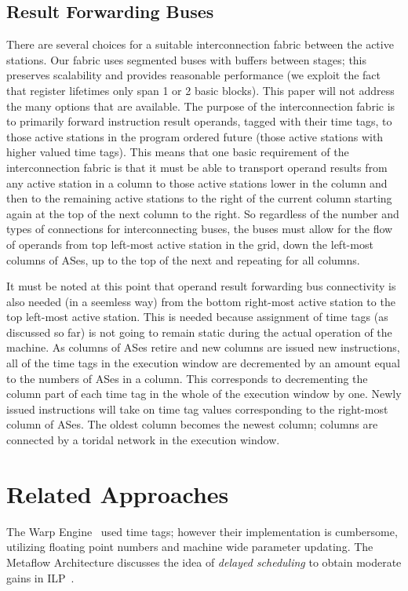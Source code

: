 \documentclass[10pt,twocolumn,dvips]{article}
\begin{document}
\subsection{Result Forwarding Buses}
\vspace{-0.1in}
There are several choices for a suitable interconnection fabric between
the active stations.  Our fabric uses segmented buses with buffers
between stages; this preserves
scalability and provides reasonable performance (we exploit the fact
that register lifetimes only span 1 or 2 basic blocks).
This paper will not address the
many options that are available.  The purpose of the
interconnection fabric is to primarily forward instruction result
operands, tagged with their time tags, 
to those active stations in the program ordered future (those
active stations with higher valued time tags).  This means that one
basic requirement of the interconnection fabric is that it must be able
to transport operand results from any active station in a column to
those active stations lower in the column and then to the remaining
active stations to the right of the current column starting again at
the top of the next column to the right.  So regardless of the number
and types of connections for interconnecting buses, the buses must
allow for the flow of operands from top left-most active station in the
grid, down the left-most columns of ASes, up to the top of the next and
repeating for all columns.

It must be noted at this point that operand result forwarding
bus connectivity is also needed (in a seemless way) from the bottom
right-most active station to the top left-most active station.
This is needed because assignment of time tags (as discussed so far)
is not going to remain static during the actual operation of the machine.
As columns of ASes retire and new columns are issued new instructions,
all of the time tags in the execution window are decremented by
an amount equal to the numbers of ASes in a column.  This corresponds
to decrementing the column part of each time tag in the whole of the
execution window by one.  Newly issued instructions will take on
time tag values corresponding to the right-most 
column of ASes.  The oldest column becomes the 
newest column; columns are connected by a toridal network in the
execution window.
\vspace{-0.2in}
\section{Related Approaches}
\vspace{-0.1in}
The Warp Engine~\cite{Cleary95} used time tags; however their implementation
is cumbersome, utilizing floating point numbers and machine wide parameter
updating.  The Metaflow Architecture discusses the 
idea of {\em delayed scheduling}
to obtain moderate gains in ILP~\cite{Pop}.
\end{document}
